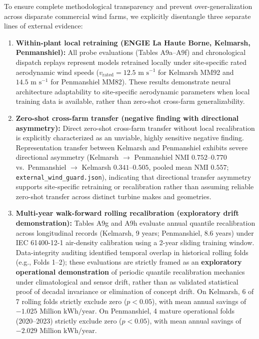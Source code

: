 \documentclass[
  journal]{IEEEtran}
\providecommand{\tightlist}{%
  \setlength{\itemsep}{0pt}\setlength{\parskip}{0pt}}
\begin{document}
To ensure complete methodological transparency and prevent
over-generalization across disparate commercial wind farms, we
explicitly disentangle three separate lines of external evidence:

\begin{enumerate}
\def\labelenumi{\arabic{enumi}.}
\tightlist
\item
  \textbf{Within-plant local retraining (ENGIE La Haute Borne, Kelmarsh,
  Penmanshiel):} All probe evaluations (Tables A9a--A9f) and
  chronological dispatch replays represent models retrained locally
  under site-specific rated aerodynamic wind speeds
  (\(v_{\mathrm{rated}} = 12.5\text{ m s}^{-1}\) for Kelmarsh MM92 and
  \(14.5\text{ m s}^{-1}\) for Penmanshiel MM82). These results
  demonstrate neural architecture adaptability to site-specific
  aerodynamic parameters when local training data is available, rather
  than zero-shot cross-farm generalizability.
\item
  \textbf{Zero-shot cross-farm transfer (negative finding with
  directional asymmetry):} Direct zero-shot cross-farm transfer without
  local recalibration is explicitly characterized as an unviable, highly
  sensitive negative finding. Representation transfer between Kelmarsh
  and Penmanshiel exhibits severe directional asymmetry (Kelmarsh
  \(\to\) Penmanshiel NMI \(0.752\)--\(0.770\) vs.~Penmanshiel \(\to\)
  Kelmarsh \(0.341\)--\(0.505\), pooled mean NMI \(0.557\);
  \texttt{external\_wind\_guard.json}), indicating that directional
  transfer asymmetry supports site-specific retraining or recalibration
  rather than assuming reliable zero-shot transfer across distinct
  turbine makes and geometries.
\item
  \textbf{Multi-year walk-forward rolling recalibration (exploratory
  drift demonstration):} Tables A9g and A9h evaluate annual quantile
  recalibration across longitudinal records (Kelmarsh, 9 years;
  Penmanshiel, 8.6 years) under IEC 61400-12-1 air-density calibration
  using a 2-year sliding training window. Data-integrity auditing
  identified temporal overlap in historical rolling folds (e.g., Folds
  1--2); these evaluations are strictly framed as an \textbf{exploratory
  operational demonstration} of periodic quantile recalibration
  mechanics under climatological and sensor drift, rather than as
  validated statistical proof of decadal invariance or elimination of
  concept drift. On Kelmarsh, 6 of 7 rolling folds strictly exclude zero
  (\(p < 0.05\)), with mean annual savings of
  \(-1.025 \text{ Million kWh/year}\). On Penmanshiel, 4 mature
  operational folds (2020--2023) strictly exclude zero (\(p < 0.05\)),
  with mean annual savings of \(-2.029 \text{ Million kWh/year}\).
\end{enumerate}
\end{document}
